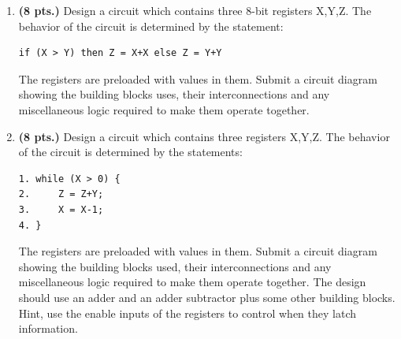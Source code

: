 \begin{enumerate}
\item {\bf (8 pts.)} Design a circuit which contains three 8-bit 
registers X,Y,Z.  The behavior of the circuit is determined by the statement:
\begin{verbatim}
if (X > Y) then Z = X+X else Z = Y+Y
\end{verbatim}
The registers are preloaded with values in them.
Submit a circuit diagram showing the building blocks uses,
their interconnections and any miscellaneous logic required to make
them operate together.
\begin{solution} {
\begin{figure}[ht]
\end{figure}
} \end{solution}


\item {\bf (8 pts.)} Design a circuit which contains three registers X,Y,Z.
The behavior of the circuit is determined by the statements:
\begin{verbatim}
1. while (X > 0) {
2.     Z = Z+Y;
3.     X = X-1;
4. } 
\end{verbatim}
The registers are preloaded with values in them.
Submit a circuit diagram showing the building blocks used,
their interconnections and any miscellaneous logic required to make
them operate together.  The design should use an adder and an
adder subtractor plus some other building blocks.  Hint, use
the enable inputs of the registers to control when they
latch information.


\end{enumerate}
